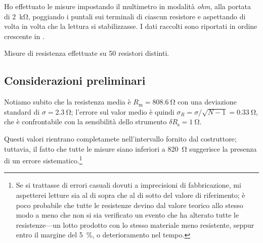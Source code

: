         Ho effettuato le misure impostando il multimetro in modalità \emph{ohm}, alla portata di \SI{2}{\kilo\ohm}, poggiando i puntali sui terminali di ciascun resistore e aspettando di volta in volta che la lettura si stabilizzasse. I dati raccolti sono riportati in ordine crescente in .
        \begin{table}
            \centering
            
            \caption{Misure di resistenza effettuate su \num{50} resistori distinti.}
            \label{tab:mul:resistori}
        \end{table}

        \subsection{Considerazioni preliminari}
            Notiamo subito che la resistenza media è $R_\text{m} = \SI{808.6}{\ohm}$ con una deviazione standard di $\sigma = \SI{2.3}{\ohm}$; l'errore sul valor medio è quindi $\sigma_R = \sigma / \sqrt{N-1} = \SI{0.33}{\ohm}$, che è confrontabile con la sensibilità dello strumento $\delta R_\text{s} = \SI{1}{\ohm}$.
            
            Questi valori rientrano completamete nell'intervallo fornito dal costruttore; tuttavia, il fatto che tutte le misure siano inferiori a \SI{820}{\ohm} suggerisce la presenza di un errore sistematico.\footnote{Se si trattasse di errori casuali dovuti a imprecisioni di fabbricazione, mi aspetterei letture sia al di sopra che al di sotto del valore di riferimento; è poco probabile che tutte le resistenze devino dal valore teorico allo stesso modo a meno che non si sia verificato un evento che ha alterato tutte le resistenze---un lotto prodotto con lo stesso materiale meno resistente, seppur entro il margine del \SI{5}{\%}, o deterioramento nel tempo.}

